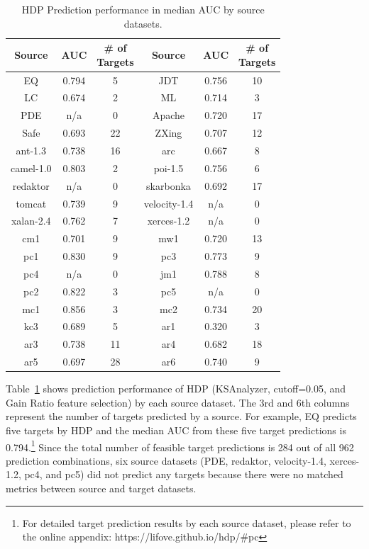 \begin{table}[!t]
\caption{HDP Prediction performance in median AUC by source datasets.}
\label{tab:by_source}
\begin{tabular}{|c||c|c||c||c|c|}
\hline
\bf{Source}	& \bf{AUC} 	&\specialcell{\bf{\# of}\\\bf{Targets}} &\bf{ Source} & \bf{AUC} 	&\specialcell{\bf{\# of}\\\bf{Targets}} \\ \hline
\hline
EQ	&0.794	&5	&JDT	&0.756	&10	\\ \hline
LC	&0.674	&2	&ML	&0.714	&3	\\ \hline
PDE	&n/a	&0	&Apache	&0.720	&17	\\ \hline
Safe	&0.693	&22	&ZXing	&0.707	&12	\\ \hline
ant-1.3	&0.738	&16	&arc	&0.667	&8	\\ \hline
camel-1.0	&0.803	&2	&poi-1.5	&0.756	&6	\\ \hline
redaktor	&n/a	&0	&skarbonka	&0.692	&17	\\ \hline
tomcat	&0.739	&9	&velocity-1.4	&n/a	&0	\\ \hline
xalan-2.4	&0.762	&7	&xerces-1.2	&n/a	&0	\\ \hline
cm1	&0.701	&9	&mw1	&0.720	&13	\\ \hline
pc1	&0.830	&9	&pc3	&0.773	&9	\\ \hline
pc4	&n/a	&0	&jm1	&0.788	&8	\\ \hline
pc2	&0.822	&3	&pc5	&n/a	&0	\\ \hline
mc1	&0.856	&3	&mc2	&0.734	&20	\\ \hline
kc3	&0.689	&5	&ar1	&0.320	&3	\\ \hline
ar3	&0.738	&11	&ar4	&0.682	&18	\\ \hline
ar5	&0.697	&28	&ar6	&0.740	&9	\\ \hline
\end{tabular}
\end{table}

Table~\ref{tab:by_source} shows prediction performance of HDP (KSAnalyzer, cutoff=0.05, and Gain Ratio feature selection) by each source dataset. The 3rd and 6th columns represent the number of targets predicted by a source. For example, EQ predicts five targets by HDP and the median AUC from these five target predictions is 0.794.\footnote{For detailed target prediction results by each source dataset, please refer to the online appendix: https://lifove.github.io/hdp/\#pc} Since the total number of feasible target predictions is 284 out of all 962 prediction combinations, six source datasets (PDE, redaktor, velocity-1.4, xerces-1.2, pc4, and pc5) did not predict any targets because there were no matched metrics between source and target datasets.

